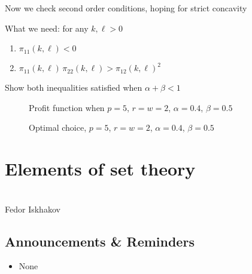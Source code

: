 \documentclass[letterpaper,10pt,english]{jupyterBook}
\begin{document}
\sphinxAtStartPar
Now we check second order conditions, hoping for strict concavity

\sphinxAtStartPar
What we need: for any \(k, \ell > 0\)
\begin{enumerate}
%
\item {} 
\sphinxAtStartPar
\(\pi_{11}(k, \ell) < 0\)

\item {} 
\sphinxAtStartPar
\(\pi_{11}(k, \ell) \, \pi_{22}(k, \ell) >  \pi_{12}(k, \ell)^2\)

\end{enumerate}

\sphinxAtStartPar
{} Show both inequalities satisfied when \(\alpha + \beta < 1\)

\begin{figure}[htbp]
\centering
\capstart

\noindent{}
\caption{Profit function when \(p=5\), \(r=w=2\), \(\alpha=0.4\), \(\beta=0.5\)}\label{\detokenize{02.optimization_intro:id19}}\end{figure}

\begin{figure}[htbp]
\centering
\capstart

\noindent{}
\caption{Optimal choice, \(p=5\), \(r=w=2\), \(\alpha=0.4\), \(\beta=0.5\)}\label{\detokenize{02.optimization_intro:id20}}\end{figure}

\sphinxstepscope


\chapter{Elements of set theory}
\label{\detokenize{03.set_theory:elements-of-set-theory}}\label{\detokenize{03.set_theory::doc}}
\sphinxAtStartPar
{}\\
Fedor Iskhakov


\section{Announcements \& Reminders}
\label{\detokenize{03.set_theory:announcements-reminders}}\begin{itemize}
\item {} 
\sphinxAtStartPar
None

\end{itemize}
\end{document}

